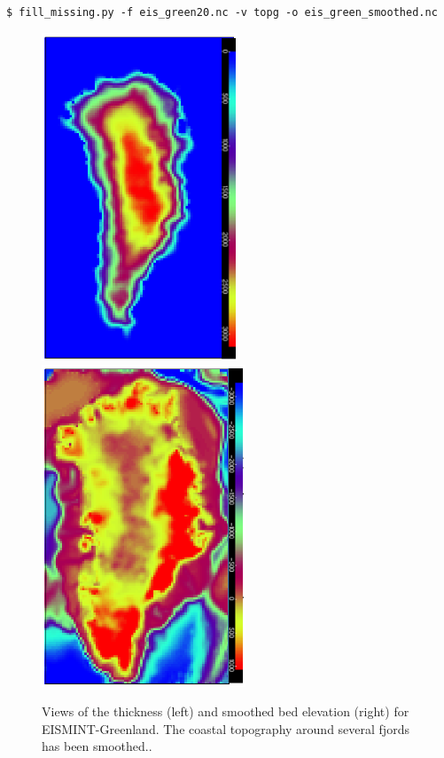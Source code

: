 \documentclass[11pt,final]{amsart}
\begin{document}
\verb|$ fill_missing.py -f eis_green20.nc -v topg -o eis_green_smoothed.nc|

\begin{figure}[ht]
\includegraphics[width=2.3in,keepaspectratio=true]{figs/EISgreen_thick}\quad\includegraphics[width=2.4in,keepaspectratio=true]{figs/EISgreen_bed}
\caption{Views of the thickness (left) and smoothed bed elevation (right) for EISMINT-Greenland.  The coastal topography around several fjords has been smoothed..}
\label{fig:greendata}
\end{figure}
\end{document}
